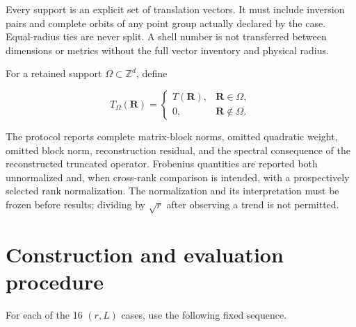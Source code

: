 \documentclass[11pt]{article}
\begin{document}
Every support is an explicit set of translation vectors. It must include inversion pairs
and complete orbits of any point group actually declared by the case. Equal-radius ties
are never split. A shell number is not transferred between dimensions or metrics without
the full vector inventory and physical radius.

For a retained support $\Omega\subset\mathbb Z^d$, define

\[
T_\Omega(\mathbf R)=
\begin{cases}
T(\mathbf R),&\mathbf R\in\Omega,\\
0,&\mathbf R\notin\Omega.
\end{cases}
\]

The protocol reports complete matrix-block norms, omitted quadratic weight, omitted block
norm, reconstruction residual, and the spectral consequence of the reconstructed
truncated operator. Frobenius quantities are reported both unnormalized and, when
cross-rank comparison is intended, with a prospectively selected rank normalization.
The normalization and its interpretation must be frozen before results; dividing by
$\sqrt r$ after observing a trend is not permitted.

\section{Construction and evaluation procedure}

For each of the 16 $(r,L)$ cases, use the following fixed sequence.
\end{document}
